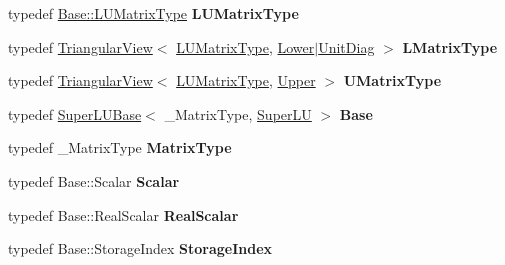 \begin{DoxyCompactItemize}
typedef \hyperlink{group___sparse_core___module}{Base\+::\+L\+U\+Matrix\+Type} {\bfseries L\+U\+Matrix\+Type}
\item 
\mbox{\label{class_eigen_1_1_super_l_u_a134f2bd95f91b4c232a3a1249cea564a}} 
typedef \hyperlink{group___core___module_class_eigen_1_1_triangular_view}{Triangular\+View}$<$ \hyperlink{group___sparse_core___module}{L\+U\+Matrix\+Type}, \hyperlink{group__enums_gga39e3366ff5554d731e7dc8bb642f83cda891792b8ed394f7607ab16dd716f60e6}{Lower}$\vert$\hyperlink{group__enums_gga39e3366ff5554d731e7dc8bb642f83cdaddb72f888ac85d5a1c52333e54f9374b}{Unit\+Diag} $>$ {\bfseries L\+Matrix\+Type}
\item 
\mbox{\label{class_eigen_1_1_super_l_u_a27d80c1a4c176c862c7faf194c15d56d}} 
typedef \hyperlink{group___core___module_class_eigen_1_1_triangular_view}{Triangular\+View}$<$ \hyperlink{group___sparse_core___module}{L\+U\+Matrix\+Type}, \hyperlink{group__enums_gga39e3366ff5554d731e7dc8bb642f83cda6bcb58be3b8b8ec84859ce0c5ac0aaec}{Upper} $>$ {\bfseries U\+Matrix\+Type}
\item 
\mbox{\label{class_eigen_1_1_super_l_u_a929eb972e66899842fda1b5f8c65426e}} 
typedef \hyperlink{class_eigen_1_1_super_l_u_base}{Super\+L\+U\+Base}$<$ \+\_\+\+Matrix\+Type, \hyperlink{class_eigen_1_1_super_l_u}{Super\+LU} $>$ {\bfseries Base}
\item 
\mbox{\label{class_eigen_1_1_super_l_u_a51df2ad6aa0b68c454390de0debc6a45}} 
typedef \+\_\+\+Matrix\+Type {\bfseries Matrix\+Type}
\item 
\mbox{\label{class_eigen_1_1_super_l_u_afab08072ca82cecde94fec93944bf01b}} 
typedef Base\+::\+Scalar {\bfseries Scalar}
\item 
\mbox{\label{class_eigen_1_1_super_l_u_a4b4d945d871a721ef24b3b6f51812f15}} 
typedef Base\+::\+Real\+Scalar {\bfseries Real\+Scalar}
\item 
\mbox{\label{class_eigen_1_1_super_l_u_a16513872355abbb0efa674592142a0f7}} 
typedef Base\+::\+Storage\+Index {\bfseries Storage\+Index}
\item 

\end{DoxyCompactItemize}
